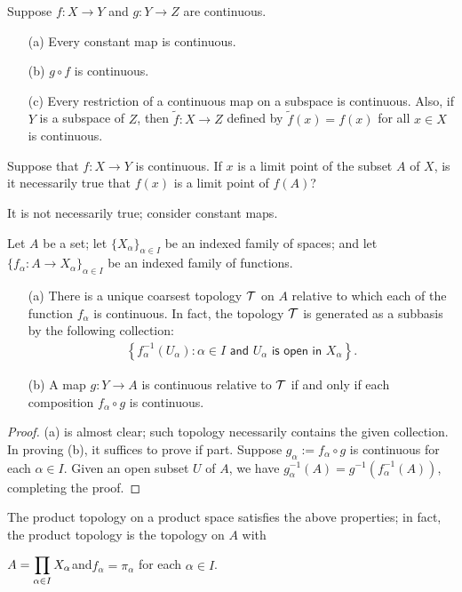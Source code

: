\begin{prop}
    Suppose $f: X\rightarrow Y$ and $g: Y\rightarrow Z$ are continuous.
    \begin{enumerate}
        \item[(a)] Every constant map is continuous.
        \item[(b)] $g\circ f$ is continuous.
        \item[(c)] Every restriction of a continuous map on a subspace is continuous. Also, if $Y$ is a subspace of $Z$, then $\tilde{f}: X\rightarrow Z$ defined by $\tilde{f}(x)=f(x)$ for all $x\in X$ is continuous.
    \end{enumerate}
\end{prop}

\begin{prob}
    Suppose that $f: X\rightarrow Y$ is continuous.
    If $x$ is a limit point of the subset $A$ of $X$, is it necessarily true that $f(x)$ is a limit point of $f(A)$?
\end{prob}
\begin{sol}
    It is not necessarily true; consider constant maps.
\end{sol}

\begin{thm}
    Let $A$ be a set; let $\{X_\alpha\}_{\alpha\in I}$ be an indexed family of spaces; and let $\{f_\alpha: A\rightarrow X_\alpha\}_{\alpha\in I}$ be an indexed family of functions.
    \begin{enumerate}
        \item[(a)]
        {
            There is a unique coarsest topology ${\mathcal{T}}$ on $A$ relative to which each of the function $f_\alpha$ is continuous. In fact, the topology ${\mathcal{T}}$ is generated as a subbasis by the following collection:
            \begin{align*}
                \left\{f_\alpha^{-1}(U_\alpha)
                :
                \alpha\in I\textsf{ and }U_\alpha\textsf{ is open in }X_\alpha\right\}.
            \end{align*}
        }
        \item[(b)]
        {
            A map $g: Y\rightarrow A$ is continuous relative to ${\mathcal{T}}$ if and only if each composition $f_\alpha\circ g$ is continuous.
        }
    \end{enumerate}
\end{thm}
\begin{proof}
    (a) is almost clear; such topology necessarily contains the given collection.
    In proving (b), it suffices to prove if part.
    Suppose $g_\alpha:=f_\alpha\circ g$ is continuous for each $\alpha\in I$.
    Given an open subset $U$ of $A$, we have $g_\alpha^{-1}(A)=g^{-1}(f_\alpha^{-1}(A))$, completing the proof.
\end{proof}
\begin{rmk}
    The product topology on a product space satisfies the above properties; in fact, the product topology is the topology on $A$ with
    \begin{center}
        $\displaystyle{A=\prod_{\alpha\in I}X_\alpha}$\quad and\quad$f_\alpha=\pi_\alpha$ for each $\alpha\in I$.
    \end{center}
\end{rmk}

